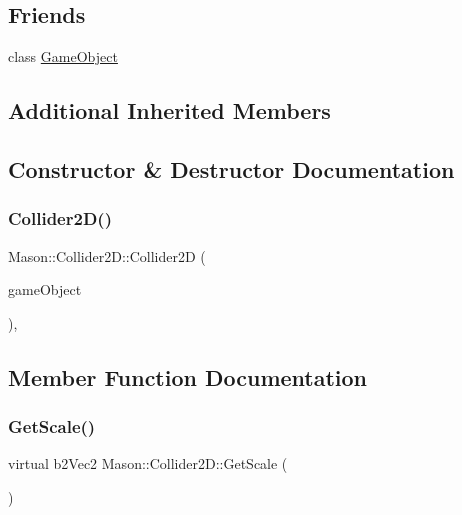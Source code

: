 \subsection*{Friends}
\begin{DoxyCompactItemize}
\item 
class \hyperlink{class_mason_1_1_collider2_d_a00df87c957d8f7ee0fc51f07a0542f4a}{Game\+Object}
\end{DoxyCompactItemize}
\subsection*{Additional Inherited Members}


\subsection{Constructor \& Destructor Documentation}
\hypertarget{class_mason_1_1_collider2_d_a7ac26a9d09d5380b49027e9ae50fdacc}{}\label{class_mason_1_1_collider2_d_a7ac26a9d09d5380b49027e9ae50fdacc} 
\subsubsection{\texorpdfstring{Collider2\+D()}{Collider2D()}}
{\footnotesize\ttfamily Mason\+::\+Collider2\+D\+::\+Collider2D (\begin{DoxyParamCaption}\item[{\hyperlink{class_mason_1_1_game_object}{Game\+Object} $\ast$}]{game\+Object }\end{DoxyParamCaption})\hspace{0.3cm}{\ttfamily [inline]}, {\ttfamily [protected]}}



\subsection{Member Function Documentation}
\hypertarget{class_mason_1_1_collider2_d_a3394739f1fea805691ac2753a9272156}{}\label{class_mason_1_1_collider2_d_a3394739f1fea805691ac2753a9272156} 
\subsubsection{\texorpdfstring{Get\+Scale()}{GetScale()}}
{\footnotesize\ttfamily virtual b2\+Vec2 Mason\+::\+Collider2\+D\+::\+Get\+Scale (\begin{DoxyParamCaption}{ }\end{DoxyParamCaption})\hspace{0.3cm}{\ttfamily [pure virtual]}}



